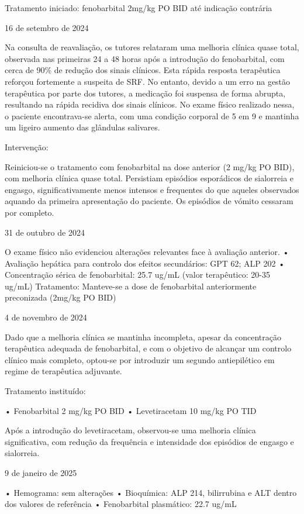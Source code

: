 Tratamento iniciado: fenobarbital 2mg/kg PO BID até indicação contrária


16 de setembro de 2024


Na consulta de reavaliação, os tutores relataram uma melhoria clínica quase total, observada nas primeiras 24 a 48 horas após a introdução do fenobarbital, com cerca de 90\% de redução dos sinais clínicos. Esta rápida resposta terapêutica reforçou fortemente a suspeita de SRF. No entanto, devido a um erro na gestão terapêutica por parte dos tutores, a medicação foi suspensa de forma abrupta, resultando na rápida recidiva dos sinais clínicos.
No exame físico realizado nessa, o paciente encontrava-se alerta, com uma condição corporal de 5 em 9 e mantinha um ligeiro aumento das glândulas salivares.


Intervenção:


Reiniciou-se o tratamento com fenobarbital na dose anterior (2 mg/kg PO BID), com melhoria clínica quase total. Persistiam episódios esporádicos de sialorreia e engasgo, significativamente menos intensos e frequentes do que aqueles observados aquando da primeira apresentação do paciente. Os episódios de vómito cessaram por completo.


31 de outubro de 2024


O exame físico não evidenciou alterações relevantes face à avaliação anterior. 
•	Avaliação hepática para controlo dos efeitos secundários: GPT 62; ALP 202
•	Concentração sérica de fenobarbital: 25.7 ug/mL (valor terapêutico: 20-35 ug/mL)
Tratamento: Manteve-se a dose de fenobarbital anteriormente preconizada (2mg/kg PO BID)


4 de novembro de 2024


Dado que a melhoria clínica se mantinha incompleta, apesar da concentração terapêutica adequada de fenobarbital, e com o objetivo de alcançar um controlo clínico mais completo, optou-se por introduzir um segundo antiepilético em regime de terapêutica adjuvante.


Tratamento instituído: 


•	Fenobarbital 2 mg/kg PO BID
•	Levetiracetam 10 mg/kg PO TID


Após a introdução do levetiracetam, observou-se uma melhoria clínica significativa, com redução da frequência e intensidade dos episódios de engasgo e sialorreia.


9 de janeiro de 2025


•	Hemograma: sem alterações
•	Bioquímica: ALP 214, bilirrubina e ALT dentro dos valores de referência
•	Fenobarbital plasmático: 22.7 ug/mL


